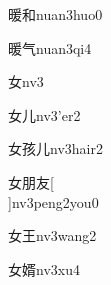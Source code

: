 \begin{verbete}[13;8]{暖和}{nuan3huo0}
\end{verbete}

\begin{verbete}[13;4]{暖气}{nuan3qi4}
\end{verbete}

\begin{verbete}[3]{女}{nv3}
\end{verbete}

\begin{verbete}[3;2]{女儿}{nv3'er2}
\end{verbete}

\begin{verbete}[3;9;2]{女孩儿}{nv3hair2}
\end{verbete}

\begin{verbete}[3;8;4]{女朋友}[\\]{nv3peng2you0}
\end{verbete}

\begin{verbete}[3;4]{女王}{nv3wang2}
\end{verbete}

\begin{verbete}[3;12]{女婿}{nv3xu4}
\end{verbete}

